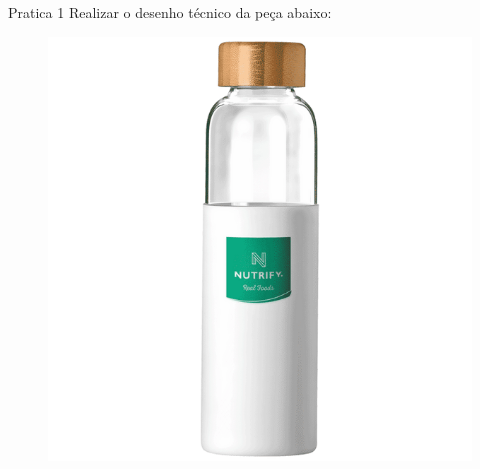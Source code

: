 \documentclass{cubeamer}
\begin{document}
\begin{frame}{Pratica 1}
    Realizar o desenho técnico da peça abaixo:
    \newline
    \begin{center}
        \begin{figure}
            \centering
            \includegraphics[height = 0.5\textheight]{img/pratica1.png}
            \caption{\cite{Garrafa:online}}
        \end{figure}
    \end{center}
    
\end{frame}
\end{document}
